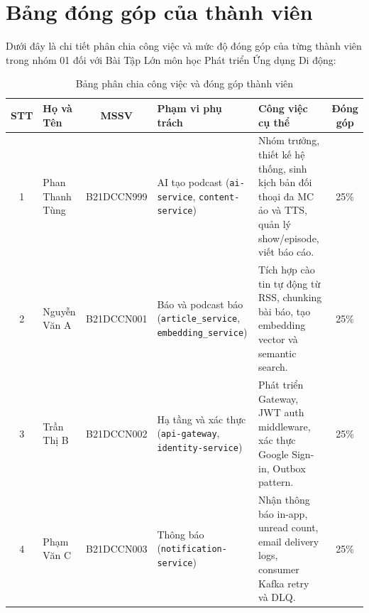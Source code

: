 \documentclass[12pt,a4paper]{report}
\begin{document}
\newpage
\chapter*{Bảng đóng góp của thành viên}

Dưới đây là chi tiết phân chia công việc và mức độ đóng góp của từng thành viên trong nhóm 01 đối với Bài Tập Lớn môn học Phát triển Ứng dụng Di động:

\vspace{0.5cm}
\begin{table}[h!]
\centering
\small
\setlength{\tabcolsep}{4pt}
\begin{tabular}{c p{2.0cm} c p{2.8cm} p{4.4cm} c}
\toprule
\textbf{STT} & \textbf{Họ và Tên} & \textbf{MSSV} & \textbf{Phạm vi phụ trách} & \textbf{Công việc cụ thể} & \textbf{Đóng góp} \\
\midrule
1 & Phan Thanh Tùng & B21DCCN999 & AI tạo podcast \newline (\texttt{ai-service}, \newline \texttt{content-}\newline \texttt{service}) & Nhóm trưởng, thiết kế hệ thống, sinh kịch bản đối thoại đa MC ảo và TTS, quản lý show/episode, viết báo cáo. & 25\% \\
\midrule
2 & Nguyễn Văn A & B21DCCN001 & Báo và podcast báo \newline (\texttt{article\_}\newline \texttt{service}, \newline \texttt{embedding\_}\newline \texttt{service}) & Tích hợp cào tin tự động từ RSS, chunking bài báo, tạo embedding vector và semantic search. & 25\% \\
\midrule
3 & Trần Thị B & B21DCCN002 & Hạ tầng và xác thực \newline (\texttt{api-gateway}, \newline \texttt{identity-}\newline \texttt{service}) & Phát triển Gateway, JWT auth middleware, xác thực Google Sign-in, Outbox pattern. & 25\% \\
\midrule
4 & Phạm Văn C & B21DCCN003 & Thông báo \newline (\texttt{notification-}\newline \texttt{service}) & Nhận thông báo in-app, unread count, email delivery logs, consumer Kafka retry và DLQ. & 25\% \\
\bottomrule
\end{tabular}
\caption{Bảng phân chia công việc và đóng góp thành viên}
\label{tab:contributions}
\end{table}
\end{document}
